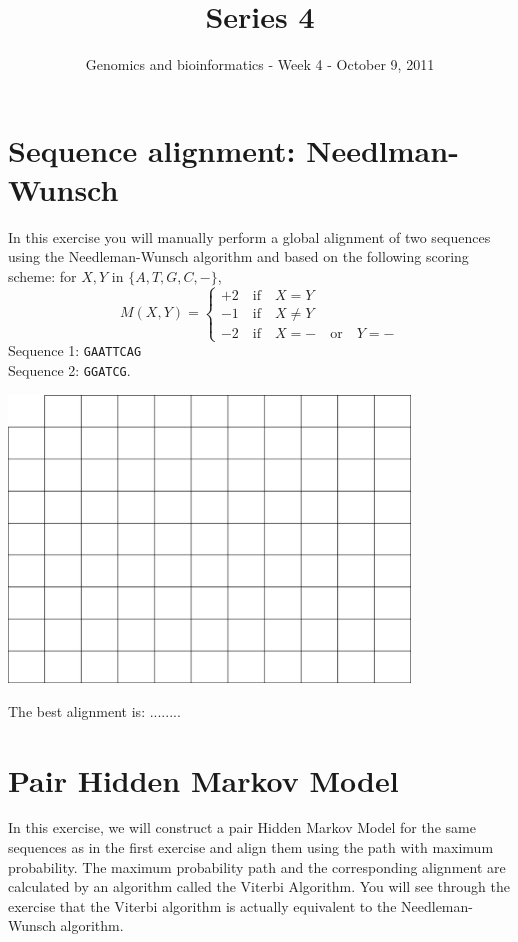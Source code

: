 \documentclass[a4paper,11pt]{article}
\title{Series 4}
\date{}
\author{Genomics and bioinformatics - Week 4 - October 9, 2011}
\begin{document}
\maketitle


\section{Sequence alignment: Needlman-Wunsch}
In this exercise you will manually perform a global alignment of two sequences using the
Needleman-Wunsch algorithm and based on the following scoring scheme: for $X,Y$ in $\{A,T,G,C,-\}$, 
$$
M(X,Y) = \left\{ 
\begin{array}{l}
	+2 \quad\text{if}\quad X = Y \\
	-1 \quad\text{if}\quad X \neq Y \\
	-2 \quad\text{if}\quad X = - \quad\text{or}\quad Y = -
\end{array} \right.
$$
Sequence 1: \texttt{GAATTCAG}\\
Sequence 2: \texttt{GGATCG}.
\vspace{0.5cm}
\begin{center}
\includegraphics[width=0.8\textwidth]{matrix.png}
\end{center}
\vspace{0.5cm}

The best alignment is: ........\\

\newpage 

\section{Pair Hidden Markov Model}

In this exercise, we will construct a pair Hidden Markov Model for
the same sequences as in the first exercise and align them using the
path with maximum probability. The maximum probability path and the 
corresponding alignment are calculated by an algorithm called the Viterbi Algorithm. 
You will see through the exercise that the Viterbi algorithm is actually equivalent
to the Needleman-Wunsch algorithm.
\end{document}
